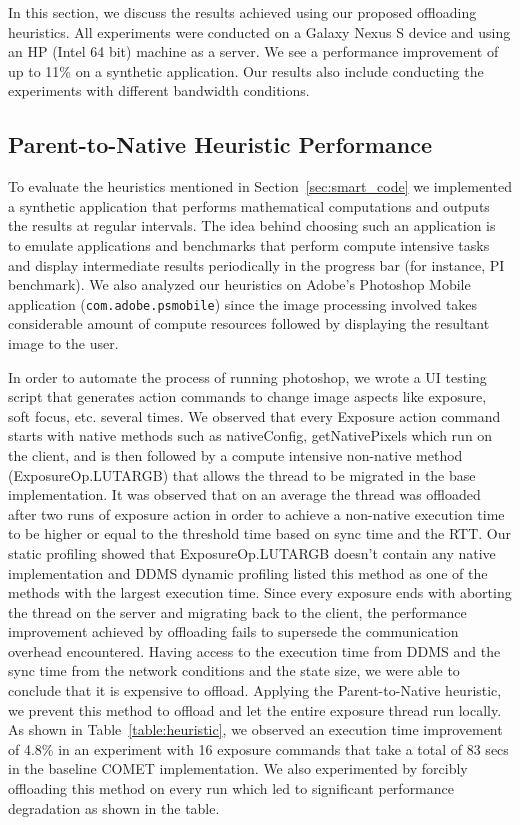 In this section, we discuss the results achieved using our proposed offloading heuristics.
All experiments were conducted on a Galaxy Nexus S device and using an HP (Intel 64 bit) machine as a server.
We see a performance improvement
of up to 11\% on a synthetic application. Our results also include conducting the experiments with different bandwidth conditions.
\subsection{Parent-to-Native Heuristic Performance}
To evaluate the heuristics mentioned in Section~\ref{sec:smart_code} we implemented a synthetic application that performs mathematical computations and outputs the results at regular intervals. The idea behind choosing such an application is to emulate applications and benchmarks that perform compute intensive tasks and display intermediate results periodically in the progress bar (for instance, PI benchmark). We also analyzed our heuristics on Adobe's Photoshop Mobile application
(\texttt{com.adobe.psmobile}) since the image processing involved takes considerable amount of compute resources followed by displaying the resultant image to the user.

In order to automate the process of running photoshop, we wrote a UI testing script that generates action commands to change image aspects like exposure, soft focus, etc. several times. We observed that every Exposure action command starts with native methods such as nativeConfig, getNativePixels which run on the client, and is then followed by a compute intensive non-native method  (ExposureOp.LUTARGB) that allows the thread to be migrated in the base implementation. It was observed that on an average the thread was offloaded after two runs of exposure action in order to achieve a non-native execution time to be higher or equal to the threshold time based on sync time and the RTT. Our static profiling showed that ExposureOp.LUTARGB doesn't contain any native implementation and DDMS dynamic profiling listed this method as one of the methods with the largest execution time. Since every exposure ends with aborting the thread on the server and migrating back to the client, the performance improvement achieved by offloading fails to supersede the communication overhead encountered. Having access to the execution time from DDMS and the sync time from the network conditions and the state size, we were able to conclude that it is expensive to offload. Applying the Parent-to-Native heuristic, we prevent this method to offload and let the entire exposure thread run locally. As shown in Table~\ref{table:heuristic}, we observed an execution time improvement of 4.8\% in an experiment with 16 exposure commands that take a total of 83 secs in the baseline COMET implementation.  We also experimented by forcibly offloading this method on every run which led to significant performance degradation as shown in the table.


